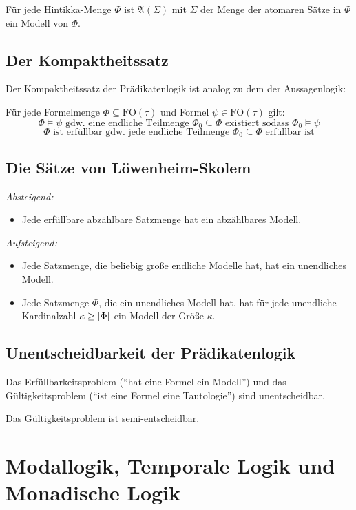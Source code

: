 \documentclass[a4paper,parskip=half*,DIV=15,fontsize=11pt]{scrartcl}
\DeclarePairedDelimiter\abs{\lvert}{\rvert}
\newcommand{\A}{\mathfrak{A}}
\newcommand{\FO}{\mathrm{FO}}
\begin{document}
Für jede Hintikka-Menge $\Phi$ ist $\A(\Sigma)$ mit $\Sigma$ der Menge der atomaren Sätze in $\Phi$ ein Modell von $\Phi$.

\subsection{Der Kompaktheitssatz}

Der Kompaktheitssatz der Prädikatenlogik ist analog zu dem der Aussagenlogik:

Für jede Formelmenge $\Phi \subseteq \FO(\tau)$ und Formel $\psi \in \FO(\tau)$ gilt:
\[\Phi \models \psi \text{ gdw.\ eine endliche Teilmenge $\Phi_0 \subseteq \Phi$ existiert sodass } \Phi_0 \models \psi\]
\[\Phi \text{ ist erfüllbar gdw.\ jede endliche Teilmenge $\Phi_0 \subseteq \Phi$ erfüllbar ist}\]

\subsection{Die Sätze von Löwenheim-Skolem}

\emph{Absteigend:}
\begin{itemize}
\item[] Jede erfüllbare abzählbare Satzmenge hat ein abzählbares Modell.
\end{itemize}

\emph{Aufsteigend:}
\begin{itemize}
\item Jede Satzmenge, die beliebig große endliche Modelle hat, hat ein unendliches Modell.
\item Jede Satzmenge $\Phi$, die ein unendliches Modell hat, hat für jede unendliche Kardinalzahl $\kappa \ge \abs{\Phi}$ ein Modell der Größe $\kappa$.
\end{itemize}

\subsection{Unentscheidbarkeit der Prädikatenlogik}

Das Erfüllbarkeitsproblem (``hat eine Formel ein Modell'') und das Gültigkeitsproblem (``ist eine Formel eine Tautologie'') sind unentscheidbar.

Das Gültigkeitsproblem ist semi-entscheidbar.

\section{Modallogik, Temporale Logik und Monadische Logik}
\end{document}
